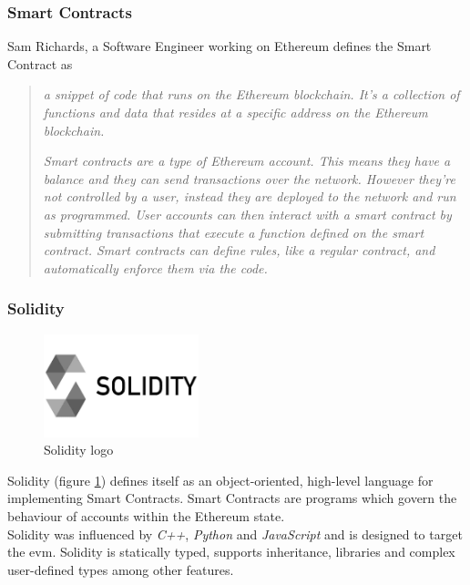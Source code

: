 \documentclass[a4paper, 12pt]{article} %
\begin{document}
        \subsubsection{Smart Contracts}
            Sam Richards\cite{smartContracts}, a Software Engineer working on Ethereum defines the Smart Contract as 
            \begin{quote}
                \textit{a snippet of code that runs on the Ethereum blockchain. It's a collection of functions and data that resides at a specific address on the Ethereum blockchain.}

                \textit{Smart contracts are a type of Ethereum account. This means they have a balance and they can send transactions over the network. However they're not controlled by a user, instead they are deployed to the network and run as programmed. User accounts can then interact with a smart contract by submitting transactions that execute a function defined on the smart contract. Smart contracts can define rules, like a regular contract, and automatically enforce them via the code.}
            \end{quote}

        \subsubsection{Solidity}
            \begin{figure}[h]
                \centering
                \includegraphics[width=0.4\textwidth]{solidity-logo.jpg}
                \caption{Solidity logo}
                \label{fig:solidity_logo}
            \end{figure}
            
            Solidity (figure \ref{fig:solidity_logo}) defines itself as an object-oriented, high-level language for implementing Smart Contracts. Smart Contracts are programs which govern the behaviour of accounts within the Ethereum state.\\
            
            Solidity\cite{solidityGit} was influenced by \textit{C++}, \textit{Python} and \textit{JavaScript} and is designed to target the \acrfull{evm}. Solidity is statically typed, supports inheritance, libraries and complex user-defined types among other features.\\
\end{document}

